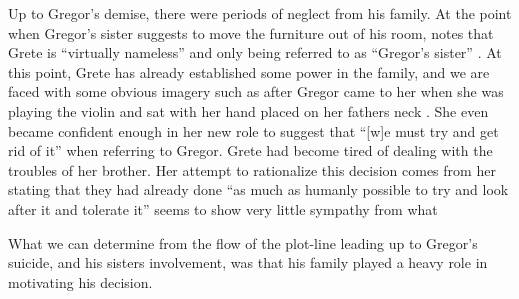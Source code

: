 \documentclass{article}
\begin{document}

Up to Gregor's demise, there were periods of neglect from his family. At the
point when Gregor's sister suggests to move the furniture out of his room,
\citeauthor{cantrellFamily} notes that Grete is ``virtually nameless'' and
only being referred to as ``Gregor's sister'' \cite[584,
584]{cantrellFamily}. At this point, Grete has already established some
power in the family, and we are faced with some obvious imagery such as
after Gregor came to her when she was playing the violin and sat with her
hand placed on her fathers neck \cite[140]{kafka2007meta}. She even became
confident enough in her new role to suggest that ``[w]e must try and get rid
of it'' \cite[138]{kafka2007meta} when referring to Gregor. Grete had become
tired of dealing with the troubles of her brother. Her attempt to
rationalize this decision comes from her stating that they had already done
``as much as humanly possible to try and look after it and tolerate it''
\cite[138]{kafka2007meta} seems to show very little sympathy from what



What we can determine from the flow of the plot-line leading up to Gregor's
suicide, and his sisters involvement, was that his family played a heavy
role in motivating his decision.

\makeworkscited
\end{document}
